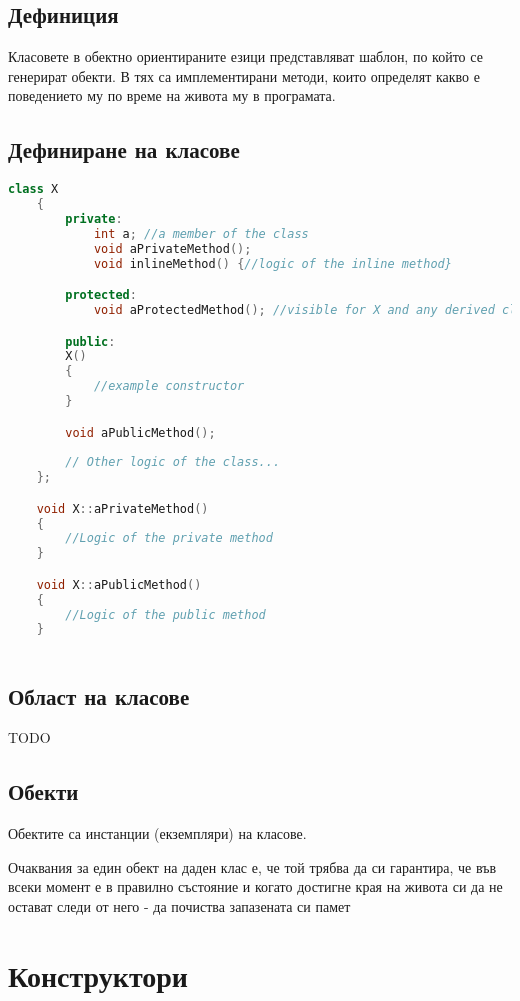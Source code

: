 \documentclass[fleqn,12pt]{article}
\begin{document}
\subsection{Дефиниция}
Класовете в обектно ориентираните езици представляват шаблон, по който се генерират обекти. В тях са имплементирани методи, които определят какво е поведението му по време на живота му в програмата. 


\subsection{Дефиниране на класове}
\begin{lstlisting}[language=C++, caption=Example skeletal definition of a class]
    class X
    {
        private:
            int a; //a member of the class
            void aPrivateMethod();
            void inlineMethod() {//logic of the inline method}

        protected:
            void aProtectedMethod(); //visible for X and any derived class of X

        public:
        X() 
        {
            //example constructor
        }

        void aPublicMethod();
    
        // Other logic of the class...
    };

    void X::aPrivateMethod()
    {
        //Logic of the private method
    }

    void X::aPublicMethod()
    {
        //Logic of the public method
    }
    
\end{lstlisting}


\subsection{Област на класове}
TODO

\subsection{Обекти}
Обектите са инстанции (екземпляри) на класове.

Очаквания за един обект на даден клас е, че той трябва да си гарантира, че във всеки момент е в правилно състояние и когато достигне края на живота си да не остават следи от него - да почиства запазената си памет


\section{Конструктори}
\end{document}
